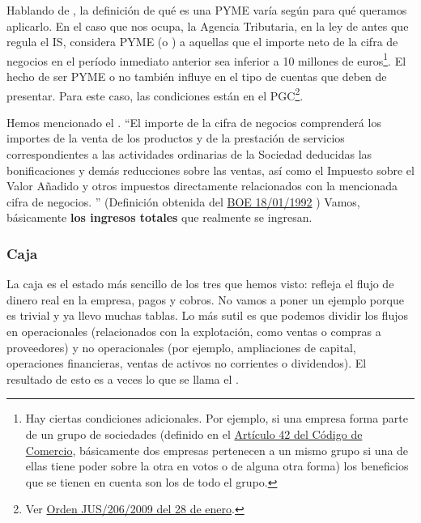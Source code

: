\documentclass[nochap,palatino,shortheader]{apuntes}
\begin{document}
Hablando de , la definición de qué es una PYME varía según para qué queramos aplicarlo. En el caso que nos ocupa, la Agencia Tributaria, en la ley de antes que regula el IS, considera PYME (o ) a aquellas que el importe neto de la cifra de negocios en el período inmediato anterior sea inferior a 10 millones de euros\footnote{Hay ciertas condiciones adicionales. Por ejemplo, si una empresa forma parte de un grupo de sociedades (definido en el \href{https://www.boe.es/buscar/act.php?id=BOE-A-1885-6627&tn=1&vd=&p=20150721}{Artículo 42 del Código de Comercio}, básicamente dos empresas pertenecen a un mismo grupo si una de ellas tiene poder sobre la otra en votos o de alguna otra forma) los beneficios que se tienen en cuenta son los de todo el grupo.}. El hecho de ser PYME o no también influye en el tipo de cuentas que deben de presentar. Para este caso, las condiciones están en el PGC\footnote{Ver \href{https://www.boe.es/boe/dias/2009/02/10/pdfs/BOE-A-2009-2276.pdf}{Orden JUS/206/2009 del 28 de enero}.}.



Hemos mencionado el . ``El importe de la cifra de negocios comprenderá los importes de la venta de los productos y de la prestación de servicios correspondientes a las actividades ordinarias de la Sociedad deducidas las bonificaciones y demás reducciones sobre las ventas, así como el Impuesto sobre el Valor Añadido y otros impuestos directamente relacionados con la mencionada cifra de negocios.  '' (Definición obtenida del \href{http://www.minhap.gob.es/Documentacion/Publico/NormativaDoctrina/Contabilidad%20y%20Auditoria%20de%20Empresas/Contabilidad/cifranegocA.pdf}{BOE 18/01/1992}
) Vamos, básicamente \textbf{los ingresos totales} que realmente se ingresan.

\subsubsection{Caja}

La caja es el estado más sencillo de los tres que hemos visto: refleja el flujo de dinero real en la empresa, pagos y cobros. No vamos a poner un ejemplo porque es trivial y ya llevo muchas tablas. Lo más sutil es que podemos dividir los flujos en operacionales (relacionados con la explotación, como ventas o compras a proveedores) y no operacionales (por ejemplo, ampliaciones de capital, operaciones financieras, ventas de activos no corrientes o dividendos). El resultado de esto es a veces lo que se llama el .
\end{document}
